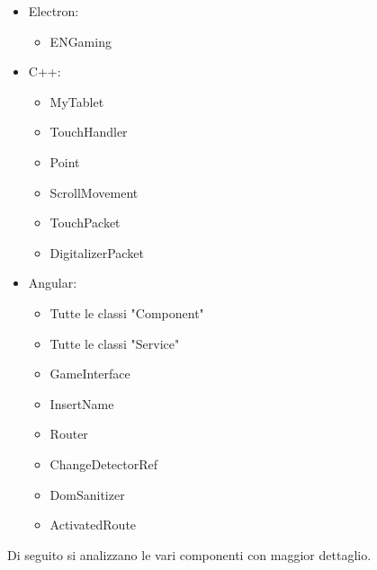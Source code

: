 \begin{itemize}
    \item Electron: \begin{itemize}
        \item ENGaming
    \end{itemize}
    \item C++: \begin{itemize}
        \item MyTablet
        \item TouchHandler
        \item Point
        \item ScrollMovement
        \item TouchPacket
        \item DigitalizerPacket
    \end{itemize}
    \item Angular: \begin{itemize}
        \item Tutte le classi "Component"
        \item Tutte le classi "Service"
        \item GameInterface
        \item InsertName
        \item Router
        \item ChangeDetectorRef
        \item DomSanitizer
        \item ActivatedRoute
    \end{itemize}
\end{itemize}
Di seguito si analizzano le vari componenti con maggior dettaglio.
\newpage
